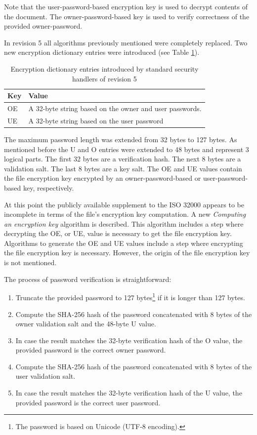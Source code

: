 \documentclass[11pt,oneside]{fithesis2}
\begin{document}
Note that the user-password-based encryption key is used to decrypt contents of the document. The owner-password-based key is used to verify correctness of the provided owner-password.

In revision 5 all algorithms previously mentioned were completely replaced. Two new encryption dictionary entries were introduced (see Table \ref{additional_handler_entries}). 

\begin{table}[h]
	\centering
	\begin{tabular}{|l|l|}
               \hline
		\textbf{Key}&\textbf{Value}\\
	\hline
		OE&A 32-byte string based on the owner and user passwords.\\
		UE&A 32-byte string based on the user password\\
	\hline
           \end{tabular}
	\caption{Encryption dictionary entries introduced by standard security handlers of revision 5}
	\label{additional_handler_entries}
\end{table}

The maximum password length was extended from 32 bytes to 127 bytes. As mentioned before the U and O entries were extended to 48 bytes and represent 3 logical parts. The first 32 bytes are a verification hash. The next 8 bytes are a validation salt. The last 8 bytes are a key salt. The OE and UE values contain the file encryption key encrypted by an owner-password-based or user-password-based key, respectively.

At this point the publicly available supplement to the ISO 32000 \cite{iso32000sup} appears to be incomplete in terms of the file's encryption key computation. A new \textit{Computing an encryption key} algorithm is described. This algorithm includes a step where decrypting the OE, or UE, value is necessary to get the file encryption key. Algorithms to generate the OE and UE values include a step where encrypting the file encryption key is necessary. However, the origin of the file encryption key is not mentioned. 

The process of password verification is straightforward:

\begin{enumerate}
\setlength\itemsep{0.1em}
\item{Truncate the provided password to 127 bytes\footnote{The password is based on Unicode (UTF-8 encoding).} if it is longer than 127 bytes.}
\item{Compute the SHA-256 hash of the password concatenated with 8 bytes of the owner validation salt and the 48-byte U value.}
\item{In case the result matches the 32-byte verification hash of the O value, the provided password is the correct owner password.}
\item{Compute the SHA-256 hash of the password concatenated with 8 bytes of the user validation salt.}
\item{In case the result matches the 32-byte verification hash of the U value, the provided password is the correct user password.}
\end{enumerate}
\end{document}
